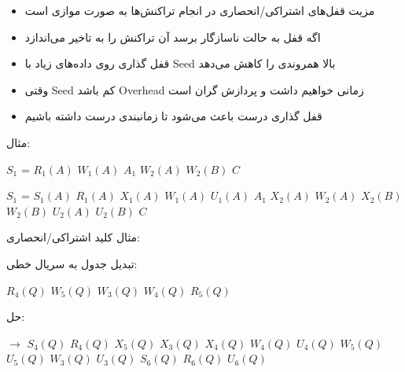 \documentclass[a4paper]{article}
\begin{document}
\begin{itemize}
    \item مزیت قفل‌های اشتراکی/انحصاری در انجام تراکنش‌ها به صورت موازی است
    \item اگه قفل به حالت ناسازگار برسد آن تراکنش را به تاخیر می‌اندازد
    \item قفل گذاری روی داده‌های زیاد با Seed بالا همروندی را کاهش می‌دهد
    \item وقتی Seed کم باشد Overhead زمانی خواهیم داشت و پردازش گران است
    \item قفل گذاری درست باعث می‌شود تا زمانبندی درست داشته باشیم
\end{itemize}

مثال:

\begin{LTR}
    \centering
    $S_{1}$ = $R_{1}(A)$ $W_{1}(A)$ $A_{1}$ $W_{2}(A)$ $W_{2}(B)$ $C$

    $S_{1}$ = $S_{1}(A)$ $R_{1}(A)$ $X_{1}(A)$ $W_{1}(A)$ $U_{1}(A)$ $A_{1}$ $X_{2}(A)$ $W_{2}(A)$ $X_{2}(B)$ $W_{2}(B)$ $U_{2}(A)$ $U_{2}(B)$ $C$
\end{LTR}

مثال کلید اشتراکی/انحصاری:

\begin{LTR}
    \begin{table}[h]
        \centering
    \end{table}
\end{LTR}

تبدیل جدول به سریال خطی:

\begin{LTR}
    $R_{4}(Q)$ $W_{5}(Q)$ $W_{3}(Q)$ $W_{4}(Q)$ $R_{5}(Q)$
\end{LTR}

حل:

\begin{LTR}
    \centering
    $\rightarrow$ 
    $S_{4}(Q)$ $R_{4}(Q)$ 
    $X_{5}(Q)$ $X_{3}(Q)$
    $X_{4}(Q)$ $W_{4}(Q)$ $U_{4}(Q)$
    $W_{5}(Q)$ $U_{5}(Q)$
    $W_{3}(Q)$ $U_{3}(Q)$
    $S_{6}(Q)$ $R_{6}(Q)$ $U_{6}(Q)$
\end{LTR}
\end{document}
